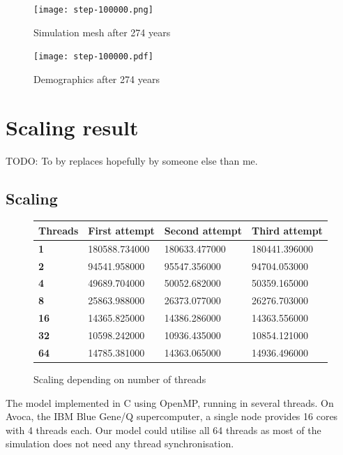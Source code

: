 \documentclass[a4paper]{article}
\newcommand{\todo}[1]{}
\renewcommand{\todo}[1]{{\color{red} TODO: {#1}}}
\begin{document}
\begin{figure}[pht]
    \centering
    \texttt{[image: step-100000.png]}
    \caption{Simulation mesh after 274 years}
    \texttt{[image: step-100000.pdf]}
    \caption{Demographics after 274 years}
\end{figure}

\section{Scaling result}

\todo{To by replaces hopefully by someone else than me.}

\subsection{Scaling}

\begin{figure}[ht]
    \centering
    \begin{tabu} {| X[0.8,c,p] || X[1,c,p] | X[1,c,p] | X[1,c,p] |}
        \rowfont{\bfseries}
        \hline
        Threads &
        First attempt &
        Second attempt&
        Third attempt \\
        \hline
        \hline
        \textbf{1} & 180588.734000 & 180633.477000 & 180441.396000 \\
        \hline
        \textbf{2} & 94541.958000 & 95547.356000 & 94704.053000 \\
        \hline
        \textbf{4} & 49689.704000 & 50052.682000 & 50359.165000 \\
        \hline
        \textbf{8} & 25863.988000 & 26373.077000 & 26276.703000 \\
        \hline
        \textbf{16} & 14365.825000 & 14386.286000 & 14363.556000 \\
        \hline
        \textbf{32} & 10598.242000 & 10936.435000 & 10854.121000 \\
        \hline
        \textbf{64} & 14785.381000 & 14363.065000 & 14936.496000 \\
        \hline
    \end{tabu}
    \caption{Scaling depending on number of threads}
\end{figure}

The model implemented in C using OpenMP, running in several threads.
On Avoca, the IBM Blue Gene/Q supercomputer, a single node provides 16 cores with 4 threads each.
Our model could utilise all 64 threads as most of the simulation does not need any thread synchronisation.
\end{document}
